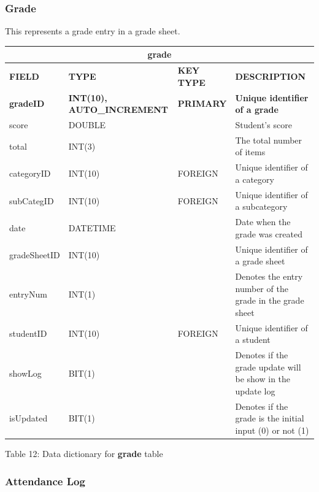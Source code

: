 \documentclass[11pt,a4paper,titlepage]{article}
\begin{document}
\newpage

\subsubsection{Grade}

This represents a grade entry in a grade sheet.

\vspace{1cm}
\begin{longtable}{ |p{2.5cm}|p{4.5cm}|p{2.5cm}|p{3cm}|  }
    \hline
    \multicolumn{4}{|c|}{\textbf{grade}} \\
    \hline
    \textbf{FIELD}&\textbf{TYPE}&\textbf{KEY TYPE}&\textbf{DESCRIPTION}\\
    \hline
    \textbf{gradeID}  & \textbf{INT(10), AUTO\_INCREMENT} & \textbf{PRIMARY} & \textbf{Unique identifier of a grade}\\ \hline
    score   & DOUBLE   & & Student's score \\ \hline
    total   & INT(3)   & & The total number of items \\ \hline
    categoryID   & INT(10)   & FOREIGN & Unique identifier of a category \\ \hline
    subCategID   & INT(10)   & FOREIGN & Unique identifier of a subcategory \\ \hline
    date   & DATETIME   & & Date when the grade was created \\ \hline
    gradeSheetID   & INT(10)   & & Unique identifier of a grade sheet \\ \hline
    entryNum   & INT(1)   & & Denotes the entry number of the grade in the grade sheet \\ \hline
    studentID   & INT(10)   & FOREIGN & Unique identifier of a student \\ \hline
    showLog & BIT(1) & &  Denotes if the grade update will be show in the update log \\ \hline
    isUpdated & BIT(1) & & Denotes if the grade is the initial input (0) or not (1) \\ \hline
\end{longtable}
    
\vspace{.5cm}
\begin{center}
    Table 12: Data dictionary for \textbf{grade} table
\end{center}

\newpage

\subsubsection{Attendance Log}
\end{document}
